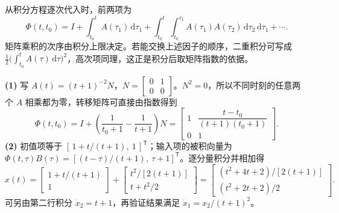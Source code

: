 从积分方程逐次代入时，前两项为
\[
\Phi(t,t_0)=I+\int_{t_0}^t A(\tau_1)\,\mathrm d\tau_1+
\int_{t_0}^t\int_{t_0}^{\tau_1} A(\tau_1)A(\tau_2)\,\mathrm d\tau_2\,\mathrm d\tau_1+\cdots .
\]
矩阵乘积的次序由积分上限决定。若能交换上述因子的顺序，二重积分可写成 $\tfrac12\bigl(\int_{t_0}^t A(\tau)\,\mathrm d\tau\bigr)^2$，高次项同理，这正是积分后取矩阵指数的依据。



\sol \textbf{(1)} 写 $A(t)=(t+1)^{-2}N$，$N=\begin{bmatrix}0&1\\0&0\end{bmatrix}$。$N^2=0$，所以不同时刻的任意两个 $A$ 相乘都为零，转移矩阵可直接由指数得到
\[
\Phi(t,t_0)=I+\left(\frac{1}{t_0+1}-\frac{1}{t+1}\right)N
=\begin{bmatrix}
1 & \dfrac{t-t_0}{(t+1)(t_0+1)}\\
0 & 1
\end{bmatrix}.
\]
\textbf{(2)} 初值项等于 $[\,1+t/(t+1),\ 1\,]^{\mathsf T}$；输入项的被积向量为 $\Phi(t,\tau)B(\tau)=[(t-\tau)/(t+1),\ \tau+1]^{\mathsf T}$。逐分量积分并相加得
\[
x(t)=
\begin{bmatrix}1+t/(t+1)\\1\end{bmatrix}+
\begin{bmatrix}t^2/[2(t+1)]\\t+t^2/2\end{bmatrix}
=
\begin{bmatrix}(t^2+4t+2)/[2(t+1)]\\(t^2+2t+2)/2\end{bmatrix}.
\]
可另由第二行积分 $\dot x_2=t+1$，再验证结果满足 $\dot x_1=x_2/(t+1)^2$。


